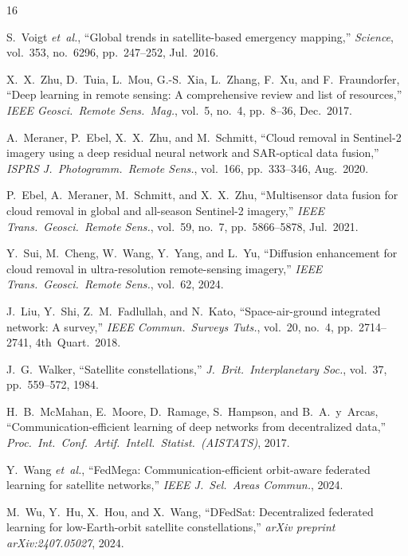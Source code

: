 \documentclass[conference]{IEEEtran}
\begin{document}
\begin{thebibliography}{16}


S.~Voigt \emph{et~al.},
``Global trends in satellite-based emergency mapping,''
\emph{Science}, vol.~353, no.~6296, pp.~247--252, Jul.\ 2016.

X.~X.~Zhu, D.~Tuia, L.~Mou, G.-S.~Xia, L.~Zhang, F.~Xu, and
F.~Fraundorfer,
``Deep learning in remote sensing: A comprehensive review and list
of resources,''
\emph{IEEE Geosci.\ Remote Sens.\ Mag.}, vol.~5, no.~4, pp.~8--36,
Dec.\ 2017.

A.~Meraner, P.~Ebel, X.~X.~Zhu, and M.~Schmitt,
``Cloud removal in Sentinel-2 imagery using a deep residual neural
network and SAR-optical data fusion,''
\emph{ISPRS J.\ Photogramm.\ Remote Sens.}, vol.~166, pp.~333--346,
Aug.\ 2020.

P.~Ebel, A.~Meraner, M.~Schmitt, and X.~X.~Zhu,
``Multisensor data fusion for cloud removal in global and all-season
Sentinel-2 imagery,''
\emph{IEEE Trans.\ Geosci.\ Remote Sens.}, vol.~59, no.~7,
pp.~5866--5878, Jul.\ 2021.

Y.~Sui, M.~Cheng, W.~Wang, Y.~Yang, and L.~Yu,
``Diffusion enhancement for cloud removal in ultra-resolution
remote-sensing imagery,''
\emph{IEEE Trans.\ Geosci.\ Remote Sens.}, vol.~62, 2024.

J.~Liu, Y.~Shi, Z.~M.~Fadlullah, and N.~Kato,
``Space-air-ground integrated network: A survey,''
\emph{IEEE Commun.\ Surveys Tuts.}, vol.~20, no.~4, pp.~2714--2741,
4th~Quart.\ 2018.

J.~G.~Walker,
``Satellite constellations,''
\emph{J.\ Brit.\ Interplanetary Soc.}, vol.~37, pp.~559--572, 1984.

H.~B.~McMahan, E.~Moore, D.~Ramage, S.~Hampson, and B.~A.~y~Arcas,
``Communication-efficient learning of deep networks from
decentralized data,''
\emph{Proc.\ Int.\ Conf.\ Artif.\ Intell.\ Statist.\ (AISTATS)},
2017.

Y.~Wang \emph{et~al.},
``FedMega: Communication-efficient orbit-aware federated learning
for satellite networks,''
\emph{IEEE J.\ Sel.\ Areas Commun.}, 2024.

M.~Wu, Y.~Hu, X.~Hou, and X.~Wang,
``DFedSat: Decentralized federated learning for low-Earth-orbit
satellite constellations,''
\emph{arXiv preprint arXiv:2407.05027}, 2024.


\end{thebibliography}
\end{document}
